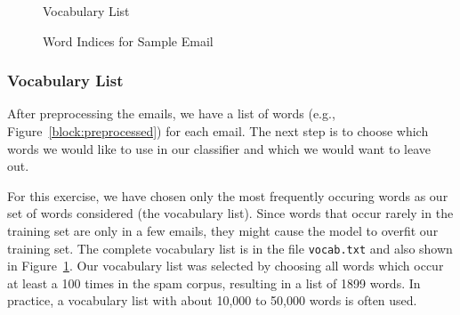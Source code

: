 \documentclass[12pt]{article}
\begin{document}
  \begin{figure}[hbt!]
    \centering
      \caption{Vocabulary List}
    \label{fig:vocab}
  \end{figure}
  \begin{figure}[hbt!]
    \centering
    
      \caption{Word Indices for Sample Email}
    \label{fig:indices}
  \end{figure}

\subsubsection{Vocabulary List}

After preprocessing the emails, we have a list of words (e.g., Figure~\ref{block:preprocessed}) for each email. The next step is to choose which words we would like to use in our classifier and which we would want to leave out.

For this exercise, we have chosen only the most frequently occuring words as our set of words considered (the vocabulary list). Since words that occur rarely in the training set are only in a few emails, they might cause the model to overfit our training set. The complete vocabulary list is in the file \texttt{vocab.txt} and also shown in Figure~\ref{fig:vocab}. Our vocabulary list was selected by choosing all words which occur at least a 100 times in the spam corpus, resulting in a list of 1899 words. In practice, a vocabulary list with about 10,000 to 50,000 words is often used.
\end{document}
